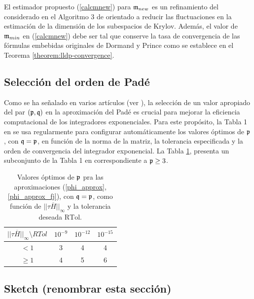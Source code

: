 El estimador propuesto (\ref{calcmnew}) para $\mathfrak{m}_{new}$ es un refinamiento del considerado en el Algoritmo 3 de \cite{niesen2012algorithm} orientado a reducir las fluctuaciones en la estimación de la dimensión de los subespacios de Krylov. Además, el valor de $\mathfrak{m}_{min}$ en (\ref{calcmnew}) debe ser tal que conserve la tasa de convergencia de las fórmulas embebidas originales de Dormand y Prince como se establece en el Teorema \ref{theorem:lldp-convergence}.

\subsection{Selección del orden de Padé}\label{sec:pade-order}
Como se ha señalado en varios artículos (ver \cite{jimenez2009rate,jimenez2012convergence, Jimenez14AMC, jimenez2015convergence}), la selección de un valor apropiado del par $(\mathfrak{p},\mathfrak{q})$ en la aproximación del Padé es crucial para mejorar la eficiencia computacional de los integradores exponenciales. Para este propósito, la Tabla 1 en \cite{moler2003nineteen} se usa regularmente para configurar automáticamente los valores óptimos de $\mathfrak{p}$, con $\mathfrak{q}=\mathfrak{p}$, en función de la norma de la matriz, la tolerancia especificada y la orden de convergencia del integrador exponencial. La Tabla \ref{table:padep}, presenta un subconjunto de la Tabla 1 en \cite{moler2003nineteen} correspondiente a $\mathfrak{p} \ge 3$.

\begin{table}[htb]
	\caption{Valores óptimos de $\mathfrak{p}$ pra las aproximaciones  (\ref{phi_approx},\ref{phi_approx_fj}), con $\mathfrak{q}=\mathfrak{p}$, como función de $\lvert\lvert \tau\overline{H} \rvert\rvert_\infty$ y la tolerancia deseada $\mathrm{RTol}$.}
	\begin{center}
		\begin{tabular}{cccc}
			\hline
			$\lvert\lvert \tau\overline{H} \rvert\rvert_\infty \setminus RTol$ & $10^{-9}$ & $10^{-12}$ & $10^{-15}$ \\
			\hline
			$<1$ & 3 & 4 & 4 \\
			$\geq 1$ & 4 & 5 & 6 \\
			\hline
		\end{tabular}
		\label{table:padep}
	\end{center}
\end{table}

\subsection{Sketch (renombrar esta sección)}

